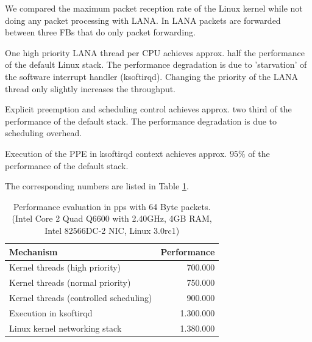 \documentclass{sig-alternate}
\begin{document}
We compared the maximum packet reception rate of the Linux kernel while not
doing any packet processing with LANA. In LANA packets are forwarded between
three FBs that do only packet forwarding. 


\begin{compactitem}
\item One high priority LANA thread per CPU achieves approx. half the performance of the default Linux stack. The performance degradation is due to 'starvation' of the software interrupt handler (ksoftirqd). Changing the priority of the LANA thread only slightly increases the throughput.
\item Explicit preemption and scheduling control achieves approx. two third of the performance of the default stack. The performance degradation is due to scheduling overhead. 
\item Execution of the PPE in ksoftirqd context achieves approx. $95\%$ of the performance of the default stack.
\end{compactitem}

The corresponding numbers are listed in Table \ref{tab:performance}.
\begin{table}[t!]
\begin{tabular}{ l r }
Mechanism & Performance\\
\hline
Kernel threads (high priority) & 700.000\\
Kernel threads (normal priority) & 750.000\\
Kernel threads (controlled scheduling) & 900.000\\
Execution in ksoftirqd & 1.300.000\\
Linux kernel networking stack & 1.380.000\\
\end{tabular}
\vspace{-0.1cm}
\caption{Performance evaluation in pps with 64 Byte packets.
(Intel Core 2 Quad Q6600 with 2.40GHz, 4GB RAM, Intel 82566DC-2 NIC, Linux 3.0rc1)}
\label{tab:performance}
\end{table}
\end{document}
